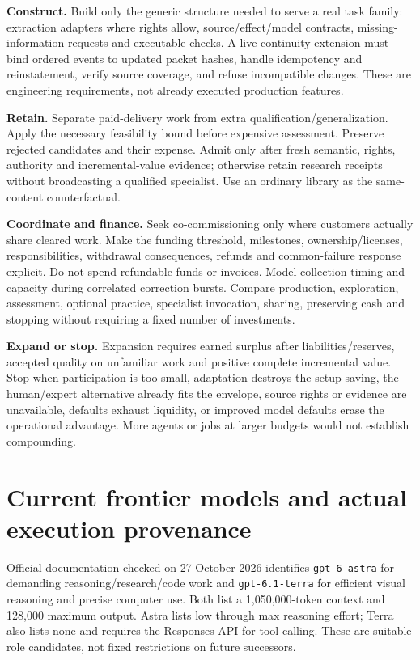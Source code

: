 \documentclass[11pt]{article}
\begin{document}
\textbf{Construct.} Build only the generic structure needed to serve a real task family: extraction adapters where rights allow, source/effect/model contracts, missing-information requests and executable checks. A live continuity extension must bind ordered events to updated packet hashes, handle idempotency and reinstatement, verify source coverage, and refuse incompatible changes. These are engineering requirements, not already executed production features.

\textbf{Retain.} Separate paid-delivery work from extra qualification/generalization. Apply the necessary feasibility bound before expensive assessment. Preserve rejected candidates and their expense. Admit only after fresh semantic, rights, authority and incremental-value evidence; otherwise retain research receipts without broadcasting a qualified specialist. Use an ordinary library as the same-content counterfactual.

\textbf{Coordinate and finance.} Seek co-commissioning only where customers actually share cleared work. Make the funding threshold, milestones, ownership/licenses, responsibilities, withdrawal consequences, refunds and common-failure response explicit. Do not spend refundable funds or invoices. Model collection timing and capacity during correlated correction bursts. Compare production, exploration, assessment, optional practice, specialist invocation, sharing, preserving cash and stopping without requiring a fixed number of investments.

\textbf{Expand or stop.} Expansion requires earned surplus after liabilities/reserves, accepted quality on unfamiliar work and positive complete incremental value. Stop when participation is too small, adaptation destroys the setup saving, the human/expert alternative already fits the envelope, source rights or evidence are unavailable, defaults exhaust liquidity, or improved model defaults erase the operational advantage. More agents or jobs at larger budgets would not establish compounding.

\section{Current frontier models and actual execution provenance}

Official documentation checked on 27 October 2026 identifies \texttt{gpt-6-astra} for demanding reasoning/research/code work and \texttt{gpt-6.1-terra} for efficient visual reasoning and precise computer use. Both list a 1,050,000-token context and 128,000 maximum output. Astra lists low through max reasoning effort; Terra also lists none and requires the Responses API for tool calling. These are suitable role candidates, not fixed restrictions on future successors.\citep{astra,terra}
\end{document}
